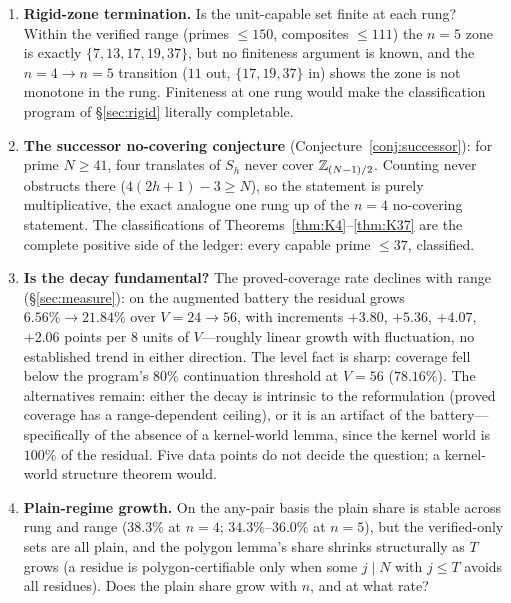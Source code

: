 \begin{enumerate}[leftmargin=1.7em,itemsep=4pt]
\item \textbf{Rigid-zone termination.} Is the unit-capable set finite at
  each rung? Within the verified range (primes $\le 150$, composites
  $\le 111$) the $n=5$ zone is exactly $\{7,13,17,19,37\}$, but no
  finiteness argument is known, and the $n=4\to n=5$ transition
  ($11$ out, $\{17,19,37\}$ in) shows the zone is not monotone in the
  rung. Finiteness at one rung would make the classification program of
  \S\ref{sec:rigid} literally completable.

\item \textbf{The successor no-covering conjecture}
  (Conjecture~\ref{conj:successor}): for prime $N\ge 41$, four
  translates of $S_h$ never cover $\mathbb{Z}_{(N-1)/2}$. Counting never
  obstructs there ($4(2h+1)-3\ge N$), so the statement is purely
  multiplicative, the exact analogue one rung up of the $n=4$
  no-covering statement. The classifications of
  Theorems~\ref{thm:K4}--\ref{thm:K37} are the complete positive side of
  the ledger: every capable prime $\le 37$, classified.

\item \textbf{Is the decay fundamental?} The proved-coverage rate
  declines with range (\S\ref{sec:measure}): on the augmented battery
  the residual grows $6.56\%\to21.84\%$ over $V=24\to56$, with
  increments $+3.80$, $+5.36$, $+4.07$, $+2.06$ points per $8$ units of
  $V$---roughly linear growth with fluctuation, no established trend in
  either direction. The level fact is sharp: coverage fell below the
  program's $80\%$ continuation threshold at $V=56$ ($78.16\%$). The
  alternatives remain: either the decay is intrinsic to the
  reformulation (proved coverage has a range-dependent ceiling), or it
  is an artifact of the battery---specifically of the absence of a
  kernel-world lemma, since the kernel world is $100\%$ of the residual.
  Five data points do not decide the question; a kernel-world structure
  theorem would.

\item \textbf{Plain-regime growth.} On the any-pair basis the plain share
  is stable across rung and range ($38.3\%$ at $n=4$; $34.3\%$--$36.0\%$
  at $n=5$), but the verified-only sets are all plain, and the
  polygon lemma's share shrinks structurally as $T$ grows (a residue is
  polygon-certifiable only when some $j\mid N$ with $j\le T$ avoids all
  residues). Does the plain share grow with $n$, and at what rate?


\end{enumerate}

